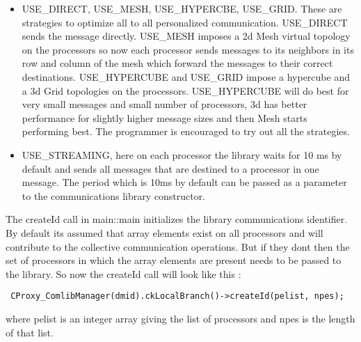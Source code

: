 \begin{itemize} 

\item USE\_DIRECT, USE\_MESH, USE\_HYPERCBE, USE\_GRID. These
are strategies to optimize all to all personalized
communication. USE\_DIRECT sends the message directly. USE\_MESH imposes
a 2d Mesh virtual topology on the processors so now each processor
sends messages to its neighbors in its row and column of the mesh
which forward the messages to their correct
destinations. USE\_HYPERCUBE and USE\_GRID impose a hypercube and a 3d
Grid topologies on the processors. USE\_HYPERCUBE will do best for very
small messages and small number of processors, 3d has better
performance for slightly higher message sizes and then Mesh starts
performing best. The programmer is encouraged to try out all the
strategies.

\item USE\_STREAMING, here on each processor the library waits for 10
ms by default and sends all messages that are destined to a processor
in one message. The period which is 10ms by default can be passed as a
parameter to the communications library constructor.

\end{itemize}

The createId call in main::main initializes the library communications
identifier. By default its assumed that array elements exist on all
processors and will contribute to the collective communication
operations. But if they dont then the set of processors in which the
array elements are present needs to be passed to the library. So now
the createId call will look like this :

\begin{verbatim}
 CProxy_ComlibManager(dmid).ckLocalBranch()->createId(pelist, npes);
\end{verbatim}

where pelist is an integer array giving the list of processors and
npes is the length of that list.
